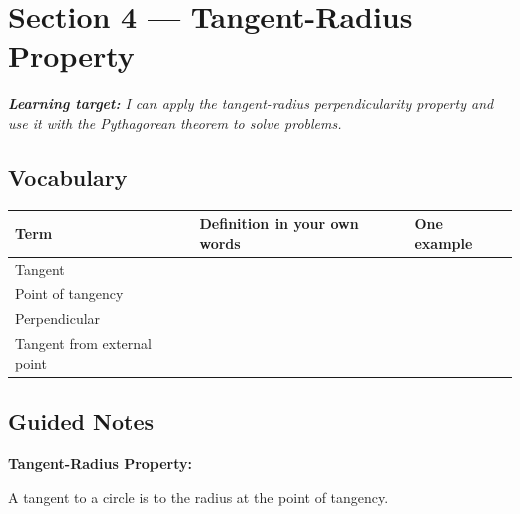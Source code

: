 \documentclass[11pt, a4paper]{article}
\newcommand{\blank}[1]{\underline{\hspace{#1}}}
\begin{document}
\clearpage

\section{Section 4 --- Tangent-Radius Property}

\begin{tcolorbox}[learningtarget]
\small\textit{\textbf{Learning target:} I can apply the tangent-radius perpendicularity property and use it with the Pythagorean theorem to solve problems.}
\end{tcolorbox}

\subsection{Vocabulary}

\renewcommand{\arraystretch}{1.9}
\begin{tabularx}{\linewidth}{|p{4.8cm}|X|X|}
\hline
\rowcolor{accentlight}\textbf{Term} & \textbf{Definition in your own words} & \textbf{One example} \\
\hline
Tangent                    & & \\ \hline
Point of tangency          & & \\ \hline
Perpendicular              & & \\ \hline
Tangent from external point & & \\ \hline
\end{tabularx}
\renewcommand{\arraystretch}{1}

\subsection{Guided Notes}

\textbf{Tangent-Radius Property:}

A tangent to a circle is \blank{5cm} to the radius at the point of tangency.

\begin{center}
\end{center}
\end{document}
